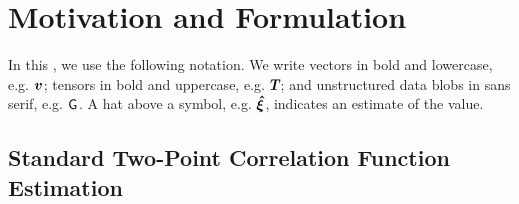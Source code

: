\section{Motivation and Formulation} 
\label{sec:motiv}

In this \documentname, we use the following notation.
We write vectors in bold and lowercase, e.g. $\bm{v}_\mathrm{}$; tensors in bold and uppercase, e.g. $\bm{T}_\mathrm{}$; and unstructured data blobs in sans serif, e.g. $\mathsf{G}_{}$.
A hat above a symbol, e.g. $\bm{\hat{\xi}}$, indicates an estimate of the value.

\subsection{Standard Two-Point Correlation Function Estimation}
\label{sec:ls}

